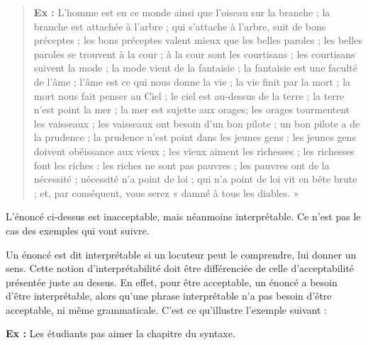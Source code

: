 \begin{quote}
\textbf{Ex :} L’homme est en ce monde ainsi que l’oiseau sur la branche ; la branche est attachée à l’arbre ; qui s’attache à l’arbre, suit de bons préceptes ; les bons préceptes valent mieux que les belles paroles ; les belles paroles se trouvent à la cour ; à la cour sont les courtisans ; les courtisans suivent la mode ; la mode vient de la fantaisie ; la fantaisie est une faculté de l’âme ; l’âme est ce qui nous donne la vie ; la vie finit par la mort ; la mort nous fait penser au Ciel ; le ciel est au-dessus de la terre ; la terre n’est point la mer ; la mer est sujette aux orages; les orages tourmentent les vaisseaux ; les vaisseaux ont besoin d’un bon pilote ; un bon pilote a de la prudence ; la prudence n’est point dans les jeunes gens ; les jeunes gens doivent obéissance aux vieux ; les vieux aiment les richesses ; les richesses font les riches ; les riches ne sont pas pauvres ; les pauvres ont de la nécessité ; nécessité n’a point de loi ; qui n’a point de loi vit en bête brute ; et, par conséquent, vous serez « damné à tous les diables. »
\end{quote}
L’énoncé ci-dessus est inacceptable, mais néanmoins interprétable. Ce n’est pas le cas des exemples qui vont suivre.

Un énoncé est dit interprétable si un locuteur peut le comprendre, lui donner un sens. Cette notion d’interprétabilité doit être différenciée de celle d’acceptabilité présentée juste au dessus. En effet, pour être acceptable, un énoncé a besoin d’être interprétable, alors qu’une phrase interprétable n’a pas besoin d’être acceptable, ni même grammaticale. C’est ce qu’illustre l’exemple suivant :

\noindent\textbf{Ex :} Les étudiants pas aimer la chapitre du syntaxe.

